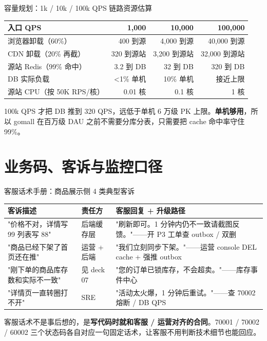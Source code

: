 \documentclass[aspectratio=169,11pt]{beamer}
\begin{document}
\begin{frame}[shrink]{容量规划：1k / 10k / 100k QPS 链路资源估算}
\begin{tabular}{@{}lrrr@{}}
\toprule
入口 QPS & 1{,}000 & 10{,}000 & 100{,}000 \\
\midrule
浏览器卸载（60\%） & 400 到源 & 4{,}000 到源 & 40{,}000 到源 \\
CDN 卸载（20\% 再截） & 320 到源站 & 3{,}200 到源站 & 32{,}000 到源站 \\
源站 Redis（99\% 命中） & 3.2 到 DB & 32 到 DB & 320 到 DB \\
DB 实际负载 & \textless 1\% 单机 & 10\% 单机 & 接近上限 \\
源站 CPU（按 50K RPS/核） & 0.01 核 & 0.1 核 & 1 核 \\
\bottomrule
\end{tabular}
\vspace{2mm}
\small 100k QPS 才把 DB 推到 320 QPS，远低于单机 6 万级 PK 上限。\textbf{单机够用}，所以 gomall 在百万级 DAU 之前不需要分库分表，只需要把 cache 命中率守住 99\%。
\end{frame}

\section{业务码、客诉与监控口径}

\begin{frame}[shrink]{客服话术手册：商品展示侧 4 类典型客诉}
\begin{center}
\footnotesize
\begin{tabular}{@{}p{32mm}p{20mm}p{48mm}@{}}
\toprule
客诉描述 & 责任方 & 客服回复 + 升级路径 \\
\midrule
"价格不对，详情写 99 列表写 88" & 后端缓存层 & "刷新即可。1 分钟内仍不一致请截图反馈。"——开 P3 工单查 outbox / 双删 \\
"商品已经下架了首页还在推" & 运营 + 后端 & "我们立刻同步下架。"——运营 console DEL cache + 强推 outbox \\
"刚下单的商品库存数和实际不一致" & 见 deck 07 & "您的订单已锁库存，不会超卖。"——库存事件中心 \\
"详情页一直转圈打不开"     & SRE       & "活动太火爆，1 分钟后重试。"——查 70002 熔断 / DB QPS \\
\bottomrule
\end{tabular}
\end{center}
\vspace{2mm}

{\small 客服话术不是事后想的，是\textbf{写代码时就和客服 / 运营对齐的合同}。70001 / 70002 / 60002 三个状态码各自对应一句固定话术，让客服不用判断技术细节也能回应。}
\end{frame}
\end{document}

